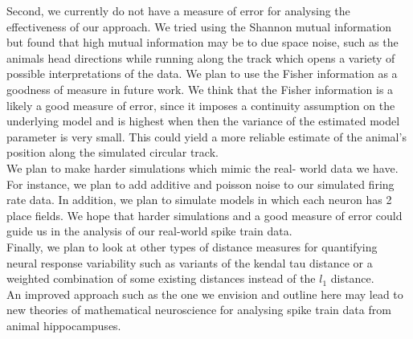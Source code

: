 Second, we currently do not have a measure of error for analysing the  effectiveness of our approach. 
We tried using the Shannon mutual information but found that  high  mutual information may be to due space noise, such as the animals head directions while running along the track which opens a variety of possible interpretations of the data.  We plan to use the Fisher information as a goodness of measure in future work. We think that the Fisher information is a likely a good measure of error, since it imposes a continuity assumption on the underlying model and is highest when then the variance of the estimated model parameter is very small. This could  yield a more reliable estimate of the animal's position along the simulated circular track. \\

We plan  to make harder simulations which mimic the real- world data we have.  For instance, we plan to  add additive and poisson noise to our simulated firing rate data.  In addition,  we plan to simulate  models in which each  neuron has 2 place fields. We hope that harder simulations and a good measure of error could guide us in the analysis of our real-world spike train data.\\

Finally, we plan to look at other types of distance measures for quantifying neural response variability such as variants of the kendal tau distance  or a weighted combination of some existing distances instead of the $l_1$ distance.\\

An improved approach such as the one we envision and outline here  may lead to new theories of mathematical neuroscience for analysing spike train data from animal hippocampuses.















